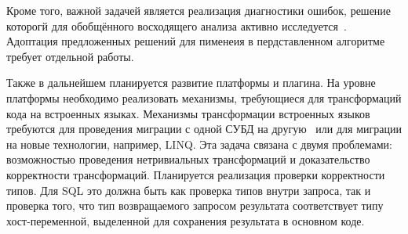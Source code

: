 Кроме того, важной задачей является реализация диагностики ошибок, решение которогй для обобщённого восходящего анализа активно исследуется~\cite{RNGLRSyntaxerror1,RNGLRSyntaxerror2, RNGLRSyntaxerror3, RNGLRSyntaxerror4}. Адоптация предложенных решений для пименеия в пердставленном алгоритме требует отдельной работы.

Также в дальнейшем планируется развитие платформы и плагина. На уровне платформы необходимо реализовать механизмы, требующиеся для трансформаций кода на встроенных языках. Механизмы трансформации встроенных языков требуются для проведения миграции с одной СУБД на другую~\cite{Syrcose} или для миграции на новые технологии, например, LINQ. Эта задача связана с двумя проблемами: возможностью проведения нетривиальных трансформаций и доказательство корректности трансформаций. Планируется реализация проверки корректности типов. Для SQL это должна быть как проверка типов внутри запроса, так и проверка того, что тип возвращаемого запросом результата соответствует типу хост-переменной, выделенной для сохранения результата в основном коде.

\clearpage
